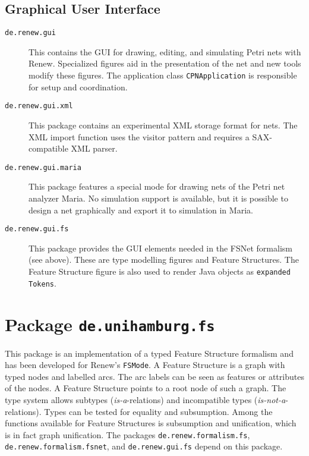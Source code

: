 \subsection{Graphical User Interface}

\begin{description}
\item[\texttt{de.renew.gui}] This contains the GUI
  for drawing, editing, and simulating Petri nets with Renew.
  Specialized figures aid in the presentation of the net
  and new tools modify these figures. The application class
  \texttt{CPNApplication} is responsible for setup and
  coordination.
\item[\texttt{de.renew.gui.xml}] This package contains
  an experimental XML storage format for nets. The XML
  import function uses the visitor pattern and requires a SAX-compatible
  XML parser.
\item[\texttt{de.renew.gui.maria}] This package features a special
  mode for drawing nets of the Petri net analyzer Maria.
  No simulation support is available, but it is possible to design
  a net graphically and export it to simulation in Maria.
\item[\texttt{de.renew.gui.fs}] This package provides the GUI
  elements needed in the FSNet formalism (see above).
  These are type modelling figures and Feature Structures.
  The Feature Structure figure is also used to render
  Java objects as \texttt{expanded Tokens}.
\end{description}

\section{Package \texttt{de.unihamburg.fs}}

This package is an implementation of a typed Feature Structure
formalism and has been developed for Renew's \texttt{FSMode}.
A Feature Structure is a graph with typed nodes and labelled arcs.
The arc labels can be seen as features or attributes of the nodes.
A Feature Structure points to a root node of such a graph.
The type system allows subtypes (\emph{is-a}-relations) and
incompatible types (\emph{is-not-a}-relations).
Types can be tested for equality and subsumption.
Among the functions available for Feature Structures is subsumption
and unification, which is in fact graph unification.
The packages \texttt{de.renew.formalism.fs},
\texttt{de.renew.formalism.fsnet}, and \texttt{de.renew.gui.fs}
depend on this package.

